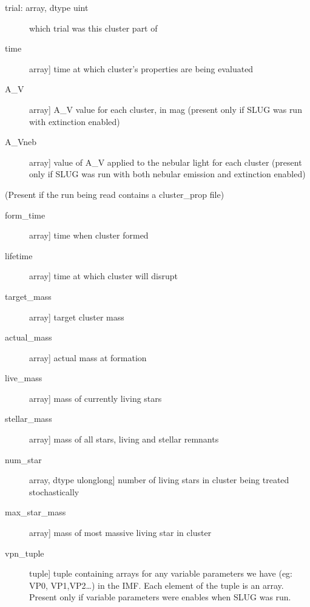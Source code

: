 \documentclass[letterpaper,10pt,english]{sphinxmanual}
\begin{document}
\begin{fulllineitems}
\begin{description}
\begin{description}
\item[{trial: array, dtype uint}] \leavevmode
which trial was this cluster part of

\item[{time}] \leavevmode{[}array{]}
time at which cluster’s properties are being evaluated

\item[{A\_V}] \leavevmode{[}array{]}
A\_V value for each cluster, in mag (present only if SLUG was
run with extinction enabled)

\item[{A\_Vneb}] \leavevmode{[}array{]}
value of A\_V applied to the nebular light for each cluster
(present only if SLUG was run with both nebular emission and
extinction enabled)

\end{description}

(Present if the run being read contains a cluster\_prop file)
\begin{description}
\item[{form\_time}] \leavevmode{[}array{]}
time when cluster formed

\item[{lifetime}] \leavevmode{[}array{]}
time at which cluster will disrupt

\item[{target\_mass}] \leavevmode{[}array{]}
target cluster mass

\item[{actual\_mass}] \leavevmode{[}array{]}
actual mass at formation

\item[{live\_mass}] \leavevmode{[}array{]}
mass of currently living stars

\item[{stellar\_mass}] \leavevmode{[}array{]}
mass of all stars, living and stellar remnants

\item[{num\_star}] \leavevmode{[}array, dtype ulonglong{]}
number of living stars in cluster being treated stochastically

\item[{max\_star\_mass}] \leavevmode{[}array{]}
mass of most massive living star in cluster

\item[{vpn\_tuple}] \leavevmode{[}tuple{]}
tuple containing arrays for any variable parameters we have
(eg: VP0, VP1,VP2…) in the IMF. Each element of the tuple
is an array. Present only if variable parameters were
enables when SLUG was run.


\end{description}
\end{description}
\end{fulllineitems}
\end{document}
